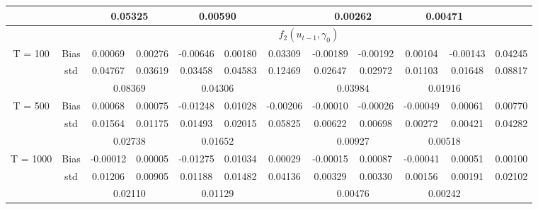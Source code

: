 \documentclass[a4paper,12pt,times,numbered,print,index]{report}
\numberwithin{equation}{section}
\begin{document}
\begin{table}[htbp]
\begin{adjustbox}{max width=\textwidth}
\begin{tabular}{cccccccccccc}
          &       & \multicolumn{2}{c}{0.05325} & \multicolumn{2}{c}{0.00590} &       & \multicolumn{2}{c}{0.00262} & \multicolumn{2}{c}{0.00471} &  \\
    \midrule
    &       & \multicolumn{10}{c}{$f_2 (u_{t-1}, \gamma_0)$}                \\
    \midrule
    \multirow{3}[1]{*}{T = 100} & Bias  & 0.00069 & 0.00276 & -0.00646 & 0.00180 & 0.03309 & -0.00189 & -0.00192 & 0.00104 & -0.00143 & 0.04245 \\
          & std   & 0.04767 & 0.03619 & 0.03458 & 0.04583 & 0.12469 & 0.02647 & 0.02972 & 0.01103 & 0.01648 & 0.08817 \\
          &       & \multicolumn{2}{c}{0.08369} & \multicolumn{2}{c}{0.04306} &       & \multicolumn{2}{c}{0.03984} & \multicolumn{2}{c}{0.01916} &  \\
    \multirow{3}[0]{*}{T = 500} & Bias  & 0.00068 & 0.00075 & -0.01248 & 0.01028 & -0.00206 & -0.00010 & -0.00026 & -0.00049 & 0.00061 & 0.00770 \\
          & std   & 0.01564 & 0.01175 & 0.01493 & 0.02015 & 0.05825 & 0.00622 & 0.00698 & 0.00272 & 0.00421 & 0.04282 \\
          &       & \multicolumn{2}{c}{0.02738} & \multicolumn{2}{c}{0.01652} &       & \multicolumn{2}{c}{0.00927} & \multicolumn{2}{c}{0.00518} &  \\
    \multirow{3}[1]{*}{T = 1000} & Bias  & -0.00012 & 0.00005 & -0.01275 & 0.01034 & 0.00029 & -0.00015 & 0.00087 & -0.00041 & 0.00051 & 0.00100 \\
          & std   & 0.01206 & 0.00905 & 0.01188 & 0.01482 & 0.04136 & 0.00329 & 0.00330 & 0.00156 & 0.00191 & 0.02102 \\
          &       & \multicolumn{2}{c}{0.02110} & \multicolumn{2}{c}{0.01129} &       & \multicolumn{2}{c}{0.00476} & \multicolumn{2}{c}{0.00242} &  \\
    \bottomrule
    \bottomrule
    \end{tabular}%
    \end{adjustbox}
  \label{tab:s_f12}%
\end{table}%
\end{document}
